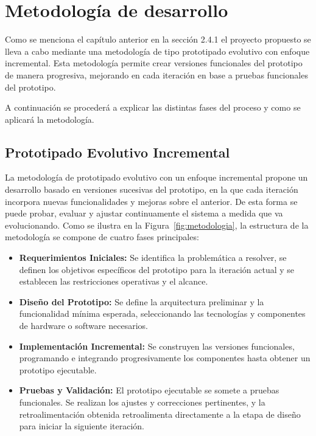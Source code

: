 \documentclass{iccmemoria}
\begin{document}
\section{Metodología de desarrollo}
Como se menciona el capítulo anterior en la sección 2.4.1 el proyecto propuesto se lleva a cabo mediante una metodología de tipo prototipado evolutivo con enfoque incremental. Esta metodología permite crear versiones funcionales del prototipo de manera progresiva, mejorando en cada iteración en base a pruebas funcionales del prototipo.

A continuación se procederá a explicar las distintas fases del proceso y como se aplicará la metodología.

\subsection{Prototipado Evolutivo Incremental}

La metodología de prototipado evolutivo con un enfoque incremental propone un desarrollo basado en versiones sucesivas del prototipo, en la que cada iteración incorpora nuevas funcionalidades y mejoras sobre el anterior. De esta forma se puede probar, evaluar y ajustar continuamente el sistema a medida que va evolucionando. Como se ilustra en la Figura~\ref{fig:metodologia}, la estructura de la metodología se compone de cuatro fases principales:

\begin{itemize}
    \item \textbf{Requerimientos Iniciales:} Se identifica la problemática a resolver, se definen los objetivos específicos del prototipo para la iteración actual y se establecen las restricciones operativas y el alcance.
    \item \textbf{Diseño del Prototipo:} Se define la arquitectura preliminar y la funcionalidad mínima esperada, seleccionando las tecnologías y componentes de hardware o software necesarios.
    \item \textbf{Implementación Incremental:} Se construyen las versiones funcionales, programando e integrando progresivamente los componentes hasta obtener un prototipo ejecutable.
    \item \textbf{Pruebas y Validación:} El prototipo ejecutable se somete a pruebas funcionales. Se realizan los ajustes y correcciones pertinentes, y la retroalimentación obtenida retroalimenta directamente a la etapa de diseño para iniciar la siguiente iteración.
\end{itemize}
\end{document}
